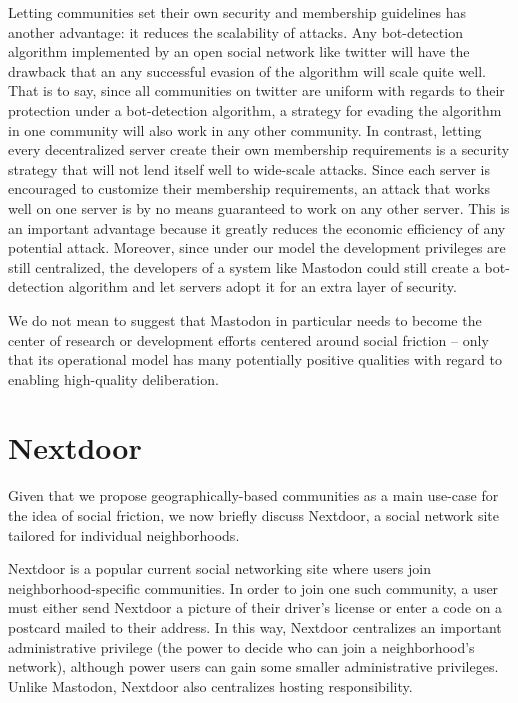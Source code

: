 \documentclass[sigconf,authordraft]{acmart}
\begin{document}
Letting communities set their own security and membership guidelines has another advantage: it reduces the scalability of attacks. Any bot-detection algorithm implemented by an open social network like twitter will have the drawback that an any successful evasion of the algorithm will scale quite well. That is to say, since all communities on twitter are uniform with regards to their protection under a bot-detection algorithm, a strategy for evading the algorithm in one community will also work in any other community. In contrast, letting every decentralized server create their own membership requirements is a security strategy that will not lend itself well to wide-scale attacks. Since each server is encouraged to customize their membership requirements, an attack that works well on one server is by no means guaranteed to work on any other server. This is an important advantage because it greatly reduces the economic efficiency of any potential attack. Moreover, since under our model the development privileges are still centralized, the developers of a system like Mastodon could still create a bot-detection algorithm and let servers adopt it for an extra layer of security.

We do not mean to suggest that Mastodon in particular needs to become the center of research or development efforts centered around social friction -- only that its operational model has many potentially positive qualities with regard to enabling high-quality deliberation.

\section{Nextdoor}

Given that we propose geographically-based communities as a main use-case for the idea of social friction, we now briefly discuss Nextdoor, a social network site tailored for individual neighborhoods.

Nextdoor is a popular current social networking site where users join neighborhood-specific communities. In order to join one such community, a user must either send Nextdoor a picture of their driver's license or enter a code on a postcard mailed to their address. In this way, Nextdoor centralizes an important administrative privilege (the power to decide who can join a neighborhood's network), although power users can gain some smaller administrative privileges. Unlike Mastodon, Nextdoor also centralizes hosting responsibility.
\end{document}
